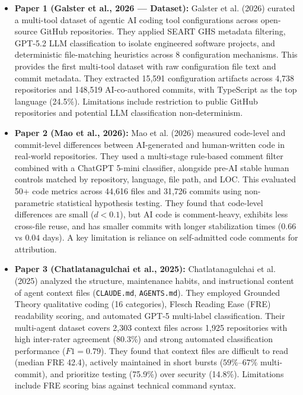 \documentclass[11pt,a4paper]{article}
\begin{document}
\begin{itemize}[leftmargin=1.5em, itemsep=8pt]

    \item \textbf{Paper 1 (Galster et al., 2026 --- Dataset):}
    Galster et al. (2026) curated a multi-tool dataset of agentic AI coding tool configurations across open-source GitHub repositories. They applied SEART GHS metadata filtering, GPT-5.2 LLM classification to isolate engineered software projects, and deterministic file-matching heuristics across 8 configuration mechanisms. This provides the first multi-tool dataset with raw configuration file text and commit metadata. They extracted 15,591 configuration artifacts across 4,738 repositories and 148,519 AI-co-authored commits, with TypeScript as the top language (24.5\%). Limitations include restriction to public GitHub repositories and potential LLM classification non-determinism.

    \item \textbf{Paper 2 (Mao et al., 2026):}
    Mao et al. (2026) measured code-level and commit-level differences between AI-generated and human-written code in real-world repositories. They used a multi-stage rule-based comment filter combined with a ChatGPT 5-mini classifier, alongside pre-AI stable human controls matched by repository, language, file path, and LOC. This evaluated 50+ code metrics across 44,616 files and 31,726 commits using non-parametric statistical hypothesis testing. They found that code-level differences are small ($d < 0.1$), but AI code is comment-heavy, exhibits less cross-file reuse, and has smaller commits with longer stabilization times ($0.66$ vs $0.04$ days). A key limitation is reliance on self-admitted code comments for attribution.

    \item \textbf{Paper 3 (Chatlatanagulchai et al., 2025):}
    Chatlatanagulchai et al. (2025) analyzed the structure, maintenance habits, and instructional content of agent context files (\texttt{CLAUDE.md}, \texttt{AGENTS.md}). They employed Grounded Theory qualitative coding (16 categories), Flesch Reading Ease (FRE) readability scoring, and automated GPT-5 multi-label classification. Their multi-agent dataset covers 2,303 context files across 1,925 repositories with high inter-rater agreement (80.3\%) and strong automated classification performance ($F1=0.79$). They found that context files are difficult to read (median FRE 42.4), actively maintained in short bursts ($59\%\text{--}67\%$ multi-commit), and prioritize testing (75.9\%) over security (14.8\%). Limitations include FRE scoring bias against technical command syntax.


\end{itemize}
\end{document}
